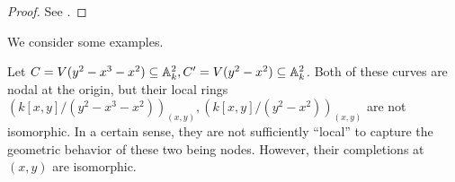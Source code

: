 \begin{proof}
    See \cite[\href{https://stacks.math.columbia.edu/tag/032A}{Tag 032A}]{stacks-project}.
\end{proof}
We consider some examples. 
\begin{example}
    Let $C=V(y^{2}-x^{3}-x^{2})\subseteq\mathbb{A}^{2}_{k},C'=V(y^{2}-x^{2})\subseteq\mathbb{A}^{2}_{k}$. Both of these curves are nodal at the origin, but their local rings $(k[x,y]/(y^{2}-x^{3}-x^{2}))_{(x,y)},(k[x,y]/(y^{2}-x^{2}))_{(x,y)}$ are not isomorphic. In a certain sense, they are not sufficiently ``local'' to capture the geometric behavior of these two being nodes. However, their completions at $(x,y)$ are isomorphic. 
\end{example}